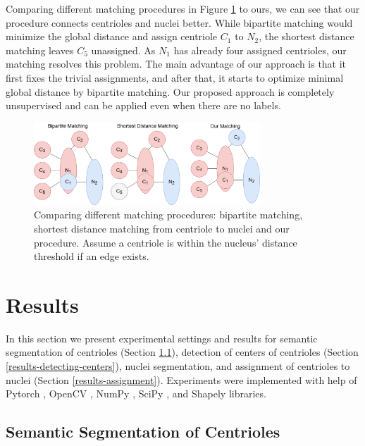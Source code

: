 \documentclass[9pt,conference,compsocconf, article]{IEEEtran}
\begin{document}
Comparing different matching procedures in Figure \ref{fig:matching_comp} to ours, we can see that our procedure connects centrioles and nuclei better. While bipartite matching would minimize the global distance and assign centriole $C_{1}$ to $N_{2}$, the shortest distance matching leaves $C_{5}$ unassigned. As $N_{1}$ has already four assigned centrioles, our matching resolves this problem. The main advantage of our approach is that it first fixes the trivial assignments, and after that, it starts to optimize minimal global distance by bipartite matching. Our proposed approach is completely unsupervised and can be applied even when there are no labels.

\begin{figure}[h!]
    \centering
    \includegraphics[width=85mm,scale=0.5]{images/compare_matching.png}
    \caption{Comparing different matching procedures: bipartite matching, shortest distance matching from centriole to nuclei and our procedure. Assume a centriole is within the nucleus' distance threshold if an edge exists.
    }
    \label{fig:matching_comp}
\end{figure}



\section{Results}

In this section we present experimental settings and results for semantic segmentation of centrioles (Section \ref{results-segmentation-centrioles}), detection of centers of centrioles (Section \ref{results-detecting-centers}), nuclei segmentation, and assignment of centrioles to nuclei (Section \ref{results-assignment}). Experiments were implemented with help of Pytorch \cite{pytorch}, OpenCV \cite{opencv}, NumPy \cite{numpy}, SciPy \cite{scipy}, and Shapely \cite{shapely} libraries. 



\subsection{Semantic Segmentation of Centrioles}
\label{results-segmentation-centrioles}
\end{document}
